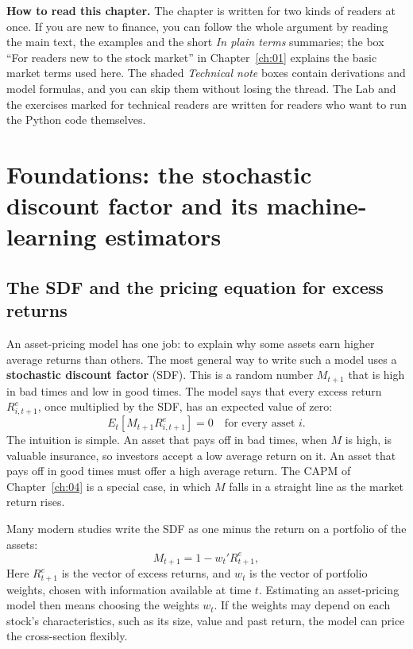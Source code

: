 \begin{callout}
\textbf{How to read this chapter.} The chapter is written for two kinds of readers at once. If you are new to finance, you can follow the whole argument by reading the main text, the examples and the short \emph{In plain terms} summaries; the box ``For readers new to the stock market'' in Chapter~\ref{ch:01} explains the basic market terms used here. The shaded \emph{Technical note} boxes contain derivations and model formulas, and you can skip them without losing the thread. The Lab and the exercises marked for technical readers are written for readers who want to run the Python code themselves.
\end{callout}

\section{Foundations: the stochastic discount factor and its machine-learning estimators}
\label{sec:22-foundations}

\subsection{The SDF and the pricing equation for excess returns}

An asset-pricing model has one job: to explain why some assets earn higher average returns than others. The most general way to write such a model uses a \textbf{stochastic discount factor} (SDF). This is a random number $M_{t+1}$ that is high in bad times and low in good times. The model says that every excess return $R^e_{i,t+1}$, once multiplied by the SDF, has an expected value of zero:
\begin{equation}
  E_t\!\left[ M_{t+1} R^e_{i,t+1} \right] = 0 \quad \text{for every asset } i.
  \label{eq:22-pricing}
\end{equation}
The intuition is simple. An asset that pays off in bad times, when $M$ is high, is valuable insurance, so investors accept a low average return on it. An asset that pays off in good times must offer a high average return. The CAPM of Chapter~\ref{ch:04} is a special case, in which $M$ falls in a straight line as the market return rises.

Many modern studies write the SDF as one minus the return on a portfolio of the assets:
\begin{equation}
  M_{t+1} = 1 - w_t' R^e_{t+1},
  \label{eq:22-sdf}
\end{equation}
Here $R^e_{t+1}$ is the vector of excess returns, and $w_t$ is the vector of portfolio weights, chosen with information available at time $t$. Estimating an asset-pricing model then means choosing the weights $w_t$. If the weights may depend on each stock's characteristics, such as its size, value and past return, the model can price the cross-section flexibly.

